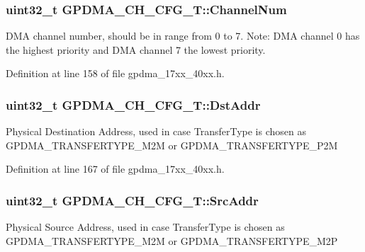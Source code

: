 \subsubsection[{\texorpdfstring{Channel\+Num}{ChannelNum}}]{\setlength{\rightskip}{0pt plus 5cm}uint32\+\_\+t G\+P\+D\+M\+A\+\_\+\+C\+H\+\_\+\+C\+F\+G\+\_\+\+T\+::\+Channel\+Num}\hypertarget{structGPDMA__CH__CFG__T_a9a37cb463108848cc37e79d230f34602}{}\label{structGPDMA__CH__CFG__T_a9a37cb463108848cc37e79d230f34602}
D\+MA channel number, should be in range from 0 to 7. Note\+: D\+MA channel 0 has the highest priority and D\+MA channel 7 the lowest priority. 

Definition at line 158 of file gpdma\+\_\+17xx\+\_\+40xx.\+h.

\subsubsection[{\texorpdfstring{Dst\+Addr}{DstAddr}}]{\setlength{\rightskip}{0pt plus 5cm}uint32\+\_\+t G\+P\+D\+M\+A\+\_\+\+C\+H\+\_\+\+C\+F\+G\+\_\+\+T\+::\+Dst\+Addr}\hypertarget{structGPDMA__CH__CFG__T_a6e67f866c02d9a27662c798bac0554b8}{}\label{structGPDMA__CH__CFG__T_a6e67f866c02d9a27662c798bac0554b8}
Physical Destination Address, used in case Transfer\+Type is chosen as G\+P\+D\+M\+A\+\_\+\+T\+R\+A\+N\+S\+F\+E\+R\+T\+Y\+P\+E\+\_\+\+M2M or G\+P\+D\+M\+A\+\_\+\+T\+R\+A\+N\+S\+F\+E\+R\+T\+Y\+P\+E\+\_\+\+P2M 

Definition at line 167 of file gpdma\+\_\+17xx\+\_\+40xx.\+h.

\subsubsection[{\texorpdfstring{Src\+Addr}{SrcAddr}}]{\setlength{\rightskip}{0pt plus 5cm}uint32\+\_\+t G\+P\+D\+M\+A\+\_\+\+C\+H\+\_\+\+C\+F\+G\+\_\+\+T\+::\+Src\+Addr}\hypertarget{structGPDMA__CH__CFG__T_a53adde93dea1ba4ce81af0fd4bd3e66e}{}\label{structGPDMA__CH__CFG__T_a53adde93dea1ba4ce81af0fd4bd3e66e}
Physical Source Address, used in case Transfer\+Type is chosen as G\+P\+D\+M\+A\+\_\+\+T\+R\+A\+N\+S\+F\+E\+R\+T\+Y\+P\+E\+\_\+\+M2M or G\+P\+D\+M\+A\+\_\+\+T\+R\+A\+N\+S\+F\+E\+R\+T\+Y\+P\+E\+\_\+\+M2P 

